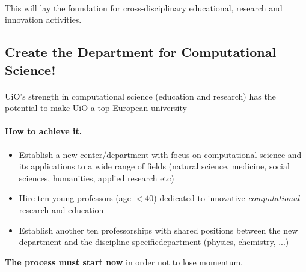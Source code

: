 \documentclass[%
twoside,                 %
final,                   %
10pt]{article}
\begin{document}
\paragraph{}
This will lay the foundation for cross-disciplinary
educational, research and innovation activities.







\subsection{Create the Department for Computational Science!}


\paragraph{}
UiO's strength in computational science (education and research)
has the potential to make UiO a top European university




\paragraph{How to achieve it.}
\begin{itemize}
\item Establish  a new center/department with focus on computational science and its applications to a wide range of fields (natural science, medicine, social sciences, humanities, applied research etc)

\item Hire ten young professors (age $< 40$) dedicated to innovative \emph{computational} research and education

\item Establish another ten professorships with  shared positions between the  new department and the discipline-specificdepartment (physics, chemistry, ...)
\end{itemize}

\noindent



\textbf{The process must start now} in order not to lose momentum.
\end{document}
